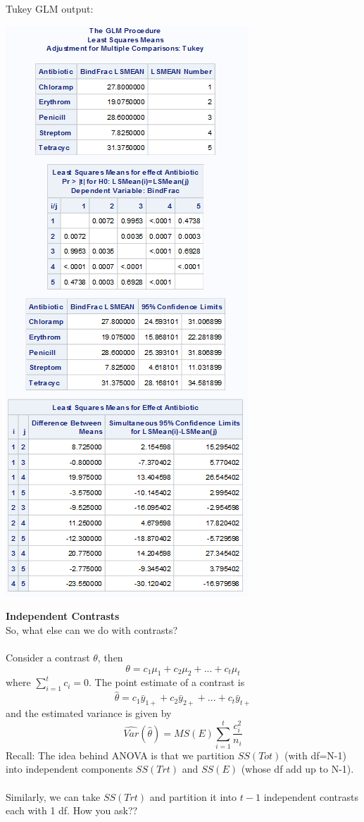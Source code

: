 Tukey GLM output:
\begin{flushleft}
\includegraphics[scale=0.8]{BindFracTukey}
\end{flushleft}

\newpage

\Large\textbf{Independent Contrasts}\large\\

So, what else can we do with contrasts?\\~\\

Consider a contrast $\theta$, then
$$\theta=c_{1}\mu_{1}+c_{2}\mu_{2}+...+c_{t}\mu_{t}$$
where $\sum_{i=1}^{t}c_i=0$.  The point estimate of a contrast is
$$\hat{\theta}=c_{1}\bar{y}_{1+}+c_{2}\bar{y}_{2+}+...+c_{t}\bar{y}_{t+}$$
and the estimated variance is given by
$$\hat{Var}(\hat{\theta})=MS(E)\sum_{i=1}^{t}\frac{c_i^2}{n_i}$$
Recall: The idea behind ANOVA is that we partition $SS(Tot)$ (with df=N-1) into independent components $SS(Trt)$ and $SS(E)$ (whose df add up to N-1).\\~\\
Similarly, we can take $SS(Trt)$ and partition it into $t-1$ independent contrasts each with 1 df.  How you ask??\\~\\

